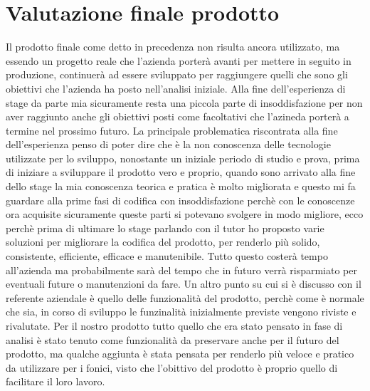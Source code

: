 \section{Valutazione finale prodotto}
\label{sec:valutazione-finale-prodotto}
Il prodotto finale come detto in precedenza non risulta ancora utilizzato, ma essendo un progetto reale che l'azienda porterà avanti per mettere in seguito in produzione, continuerà ad
essere sviluppato per raggiungere quelli che sono gli obiettivi che l'azienda ha posto nell'analisi iniziale. Alla fine dell'esperienza di stage da parte mia sicuramente resta una piccola parte
di insoddisfazione per non aver raggiunto anche gli obiettivi posti come facoltativi che l'azineda porterà a termine nel prossimo futuro. La principale problematica riscontrata alla fine
dell'esperienza penso di poter dire che è la non conoscenza delle tecnologie utilizzate per lo sviluppo, nonostante un iniziale periodo di studio e prova, prima di iniziare a sviluppare
il prodotto vero e proprio, quando sono arrivato alla fine dello stage la mia conoscenza teorica e pratica è molto migliorata e questo mi fa guardare alla prime fasi di codifica con
insoddisfazione perchè con le conoscenze ora acquisite sicuramente queste parti si potevano svolgere in modo migliore, ecco perchè prima di ultimare lo stage parlando con il tutor ho
proposto varie soluzioni per migliorare la codifica del prodotto, per renderlo più solido, consistente, efficiente, efficace e manutenibile. Tutto questo costerà tempo all'azienda ma
probabilmente sarà del tempo che in futuro verrà risparmiato per eventuali future o manutenzioni da fare. Un altro punto su cui si è discusso con il referente aziendale è quello delle
funzionalità del prodotto, perchè come è normale che sia, in corso di sviluppo le funzinalità inizialmente previste vengono riviste e rivalutate. Per il nostro prodotto tutto quello
che era stato pensato in fase di analisi è stato tenuto come funzionalità da preservare anche per il futuro del prodotto, ma qualche aggiunta è stata pensata per renderlo più veloce e
pratico da utilizzare per i fonici, visto che l'obittivo del prodotto è proprio quello di facilitare il loro lavoro.

